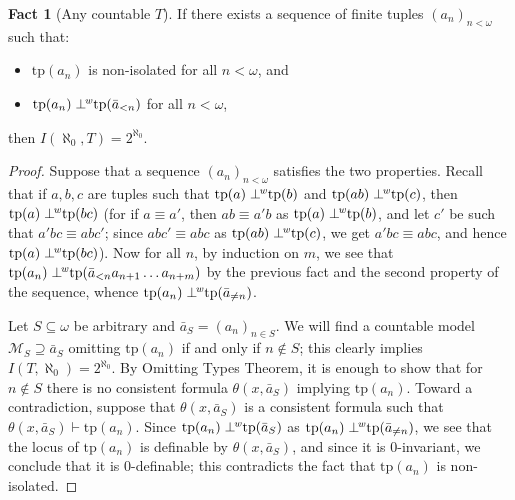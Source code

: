 \documentclass{amsart}
\theoremstyle{definition}
\theoremstyle{definition}
\newtheorem{Fact}[Theorem]{Fact}
\newcommand{\wor}{\perp\hspace*{-0.4em}^{\mathit w}}
\newcommand{\tp}{\mathrm{tp}}
\begin{document}
\begin{Fact}[Any countable $T$]\label{Fact no wor sequence in few models}
If there exists a sequence of finite tuples $(a_n)_{n<\omega}$ such that:
\begin{itemize}
    \item[--] $\tp(a_n)$ is non-isolated for all $n<\omega$, and
    \item[--] $\tp(a_n)\wor\tp(\bar a_{<n})$ for all $n<\omega$,
\end{itemize}
then $I(\aleph_0,T)=2^{\aleph_0}$.
\end{Fact}
\begin{proof}
Suppose that a sequence $(a_n)_{n<\omega}$ satisfies the two properties. Recall that if $a,b,c$ are tuples such that $\tp(a)\wor\tp(b)$ and $\tp(ab)\wor\tp(c)$, then $\tp(a)\wor\tp(bc)$ (for if $a\equiv a'$, then $ab\equiv a'b$ as $\tp(a)\wor\tp(b)$, and let $c'$ be such that $a'bc\equiv abc'$; since $abc'\equiv abc$ as $\tp(ab)\wor\tp(c)$, we get $a'bc\equiv abc$, and hence $\tp(a)\wor\tp(bc)$). Now for all $n$, by induction on $m$, we see that $\tp(a_n)\wor\tp(\bar a_{<n}a_{n+1}\dots a_{n+m})$ by the previous fact and the second property of the sequence, whence $\tp(a_n)\wor\tp(\bar a_{\neq n})$.

Let $S\subseteq\omega$ be arbitrary and $\bar a_S=(a_n)_{n\in S}$. We will find a countable model $\mathcal M_S\supseteq\bar a_S$ omitting $\tp(a_n)$ if and only if $n\notin S$; this clearly implies $I(T,\aleph_0)=2^{\aleph_0}$. By Omitting Types Theorem, it is enough to show that for $n\notin S$ there is no consistent formula $\theta(x,\bar a_S)$ implying $\tp(a_n)$. Toward a contradiction, suppose that $\theta(x,\bar a_S)$ is a consistent formula such that $\theta(x,\bar a_S)\vdash\tp(a_n)$. Since $\tp(a_n)\wor\tp(\bar a_S)$ as $\tp(a_n)\wor\tp(\bar a_{\neq n})$, we see that the locus of $\tp(a_n)$ is definable by $\theta(x,\bar a_S)$, and since it is $0$-invariant, we conclude that it is $0$-definable; this contradicts the fact that $\tp(a_n)$ is non-isolated.
\end{proof}      
\end{document}
